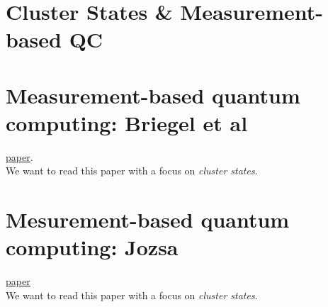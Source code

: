 \documentclass{book}
\theoremstyle{definition}
\begin{document}
%
%
%







\newpage


\section{Cluster States \& Measurement-based QC}









\newpage



\section{Measurement-based quantum computing: Briegel et al}
\href{https://www.nature.com/articles/nphys1157.pdf}{\underline{paper}}.\\

We want to read this paper with a focus on \textit{cluster states}.
\newpage


\section{Mesurement-based quantum computing: Jozsa}
\href{https://arxiv.org/pdf/quant-ph/0508124.pdf}{\underline{paper}}\\

We want to read this paper with a focus on \textit{cluster states}.



\newpage
\end{document}
